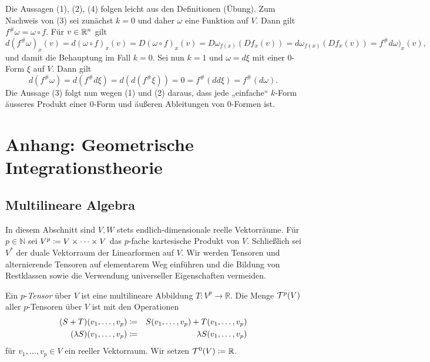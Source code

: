 \documentclass[a4paper,twoside,DIV15,BCOR12mm]{scrbook}
\begin{document}
\begin{beweis}
Die Aussagen (1), (2), (4) folgen leicht aus den Definitionen (Übung). Zum Nachweis von (3) sei 
zunächst $k=0$ und daher $\omega$ eine Funktion auf $V$. Dann gilt $f^\#\omega=\omega\circ f$. Für 
$v\in \mathbb{R}^n$ gilt
$$
d(f^\#\omega)_x(v)=d(\omega\circ f)_x(v)=D(\omega\circ f)_x(v)=D\omega_{f(x)}(Df_x(v))=d\omega_{f(x)}(Df_x(v))
=f^\#d\omega)_x(v),
$$
und damit die Behauptung im Fall $k=0$. Sei nun $k=1$ und $\omega=d\xi$ mit einer $0$-Form $\xi$ auf $V$. 
Dann gilt
$$
d(f^\#\omega)=d(f^\#d\xi)=d(d(f^\#\xi))=0=f^\#(dd\xi)=f^\#(d\omega).
$$
Die Aussage (3) folgt nun wegen (1) und (2) daraus, dass jede „einfache“ $k$-Form äu{ss}eres Produkt einer  $0$-Form und äußeren Ableitungen von $0$-Formen ist. 
\end{beweis}










\chapter{Anhang: Geometrische Integrationstheorie}


\section{Multilineare Algebra}

In diesem Abschnitt sind $V, W$ stets endlich-dimensionale reelle Vektorräume. Für $p 
\in {\mathbb N}$ sei $V^{p} \da  V \times \dots \times V$ das $p$-fache 
kartesische Produkt von $V$. Schließlich sei $V^{*}$ der duale 
Vektorraum der Linearformen auf $V$. Wir werden Tensoren und 
alternierende Tensoren auf elementarem Weg einführen und die Bildung 
von Restklassen sowie die Verwendung universeller Eigenschaften 
vermeiden. 

\bigskip

 Ein $p$-{\em Tensor} über $V$ ist eine 
multilineare Abbildung $T: V^{p} \to {\mathbb R}$. Die Menge ${\cal 
T}^{p}(V)$ aller $p$-Tensoren über $V$ ist mit den Operationen 
\begin{eqnarray*}
(S + T)(v_{1},\dots,v_{p}) & \da  & S(v_{1},\dots,v_{p}) + 
T(v_{1},\dots,v_{p}) \\
(\lambda S)(v_{1},\dots,v_{p}) & \da  & \lambda S(v_{1},\dots,v_{p})
\end{eqnarray*}
für $v_{1},\dots,v_{p} \in V$ 
ein reeller Vektorraum. Wir setzen ${\cal T}^{0}(V) \da  {\mathbb R}$.\\
\end{document}
